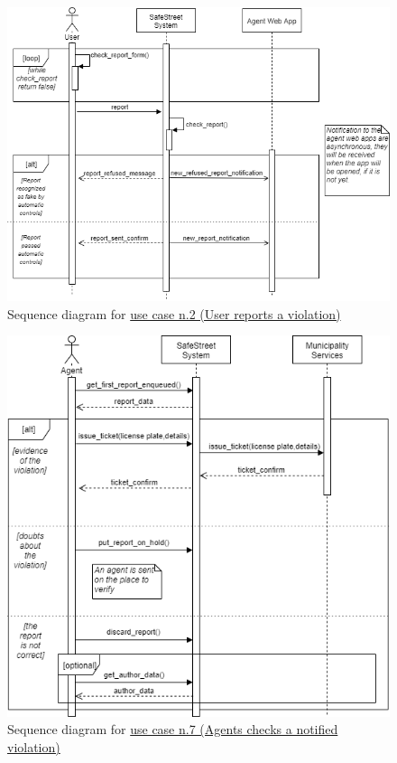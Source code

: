 \documentclass[a4paper]{report}
\begin{document}
\begin{figure}[htp]
\includegraphics[width=\textwidth]{SequenceSendReport}
\caption{Sequence diagram for \hyperref[uc:2]{use case n.2 (User reports a violation)} }
\label{fig:seq-userreport}
\end{figure}

\begin{figure}[htp]
\includegraphics[width=\textwidth]{SequenceAgentCheckReport}
\caption{Sequence diagram for \hyperref[uc:7]{use case n.7 (Agents checks a notified violation)} }
\label{fig:seq-agentcheckreport}
\end{figure}
\end{document}
